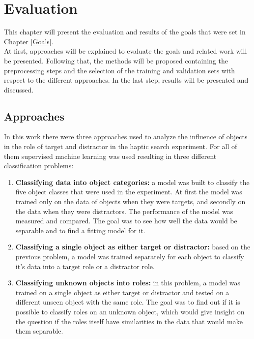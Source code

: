 
\chapter{Evaluation} %

\label{Evaluation} %
This chapter will present the evaluation and results of the goals that were set in Chapter \ref{Goals}.\\
At first, approaches will be explained to evaluate the goals and related work will be presented. Following that, the methods will be proposed containing the preprocessing steps and the selection of the training and validation sets with respect to the different approaches. In the last step, results will be presented and discussed.


\section{Approaches} \label{approaches}
In this work there were three approaches used to analyze the influence of objects in the role of target and distractor in the haptic search experiment. For all of them supervised machine learning was used resulting in three different classification problems: \\
\begin{enumerate}
	\item \textbf{Classifying data into object categories:} a model was built to classify the five object classes that were used in the experiment. At first the model was trained only on the data of objects when they were targets, and secondly on the data when they were distractors. The performance of the model was measured and compared. The goal was to see how well the data would be separable and to find a fitting model for it.
	
	\item \textbf{Classifying a single object as either target or distractor:} based on the previous problem, a model was trained separately for each object to classify it's data into a target role or a distractor role. 
	
	\item \textbf{Classifying unknown objects into roles:} in this problem, a model was trained on a single object as either target or distractor and tested on a different unseen object with the same role. The goal was to find out if it is possible to classify roles on an unknown object, which would give insight on the question if the roles itself have similarities in the data that would make them separable.  
\end{enumerate}

